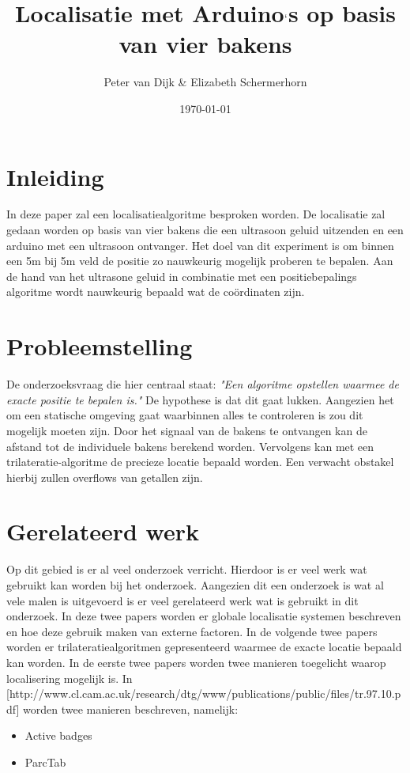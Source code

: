 \documentclass{article}
\author{Peter van Dijk \& Elizabeth Schermerhorn}
\date{\today}
\title{Localisatie met Arduino$`$s op basis van vier bakens}
\begin{document}
\maketitle
\newpage
\tableofcontents
\clearpage
\section{Inleiding}
In deze paper zal een localisatiealgoritme besproken worden. De localisatie zal gedaan worden op basis van vier bakens die een ultrasoon geluid uitzenden en een arduino met een ultrasoon ontvanger. Het doel van dit experiment is om binnen een 5m bij 5m veld de positie zo nauwkeurig mogelijk proberen te bepalen. Aan de hand van het ultrasone geluid in combinatie met een positiebepalings algoritme wordt nauwkeurig bepaald wat de co\"{o}rdinaten zijn. 


\section{Probleemstelling}
De onderzoeksvraag die hier centraal staat: \textit{"Een algoritme opstellen waarmee de exacte positie te bepalen is."} 
De hypothese is dat dit  gaat lukken. Aangezien het om een statische omgeving gaat waarbinnen alles te controleren is zou dit mogelijk moeten zijn. Door het signaal van de bakens te ontvangen kan de afstand tot de individuele bakens berekend worden. Vervolgens kan met een trilateratie-algoritme de precieze locatie bepaald worden. Een verwacht obstakel hierbij zullen overflows van getallen zijn. 

\section{Gerelateerd werk}
Op dit gebied is er al veel onderzoek verricht. Hierdoor is er veel werk wat gebruikt kan worden bij het onderzoek. Aangezien dit een onderzoek is wat al vele malen is uitgevoerd is er veel gerelateerd werk wat is gebruikt in dit onderzoek. In deze twee papers worden er globale localisatie systemen beschreven en hoe deze gebruik maken van externe factoren. In de volgende twee papers worden er trilateratiealgoritmen gepresenteerd waarmee de exacte locatie bepaald kan worden. In de eerste twee papers worden twee manieren toegelicht waarop localisering mogelijk is. In [http://www.cl.cam.ac.uk/research/dtg/www/publications/public/files/tr.97.10.pdf] worden twee manieren beschreven, namelijk:
\begin{itemize}
	\item Active badges
	\item ParcTab
\end{itemize}
\end{document}
